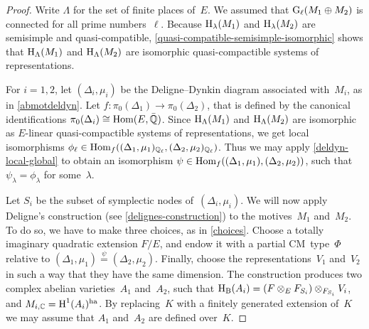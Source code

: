 \documentclass[10pt,twoside,leqno]{article}
\numberwithin{equation}{subsection}
\newcommand{\Hom}{\textnormal{Hom}}
\newcommand{\QQ}{\mathbb{Q}}
\newcommand{\QQbar}{\bar{\QQ}}
\newcommand{\QQl}{\QQ_{\ell}}
\newcommand{\CC}{\mathbb{C}}
\newcommand{\ha}{\textnormal{ha}}
\newcommand{\HH}{\textnormal{H}}
\newcommand{\Hlambda}{\HH_{\lambda}}
\newcommand{\HB}{\HH_{\textnormal{B}}}
\newcommand{\HLambda}{\HH_{\Lambda}}
\newcommand{\GG}{\textnormal{G}}
\newcommand{\Gl}{\GG_{\ell}}
\begin{document}
\begin{proposition}
\begin{proof}
  Write $\Lambda$ for the set of finite places of~$E$.
  We assumed that $\Gl(M_{1} \oplus M_{2})$
  is connected for all prime numbers~$\ell$.
  Because $\Hlambda(M_1)$ and $\Hlambda(M_2)$
  are semisimple and quasi-compatible,
  \cref{quasi-compatible-semisimple-isomorphic}
  shows that $\HLambda(M_1)$ and $\HLambda(M_2)$
  are isomorphic quasi-compactible systems of representations.

  For $i = 1,2$, let $(\Delta_i, \mu_i)$
  be the Deligne--Dynkin diagram associated with~$M_i$,
  as in \cref{abmotdeldyn}.
  Let $f \colon \pi_0(\Delta_1) \to \pi_0(\Delta_2)$,
  that is defined by the canonical identifications
  $\pi_0(\Delta_i) \cong \Hom(E,\QQbar)$.
  Since $\HLambda(M_1)$ and $\HLambda(M_2)$ are isomorphic
  as $E$-linear quasi-compactible systems of representations,
  we get local isomorphisms
  $\phi_\ell \in \Hom_f((\Delta_1,\mu_1)_{\QQl},(\Delta_2,\mu_2)_{\QQl})$.
  Thus we may apply \cref{deldyn-local-global}
  to obtain an isomorphism $\psi \in \Hom_f((\Delta_1,\mu_1),(\Delta_2,\mu_2))$,
  such that $\psi_\lambda = \phi_\lambda$ for some~$\lambda$.

  Let $S_i$ be the subset of symplectic nodes of~$(\Delta_i,\mu_i)$.
  We will now apply Deligne's construction (see \cref{delignes-construction})
  to the motives~$M_1$ and~$M_2$.
  To do so, we have to make three choices, as in \cref{choices}.
  Choose a totally imaginary quadratic extension $F/E$,
  and endow it with a partial CM~type~$\Phi$
  relative to $(\Delta_1,\mu_1) \stackrel{\psi}{=} (\Delta_2,\mu_2)$.
  Finally, choose the representations~$V_1$ and~$V_2$
  in such a way that they have the same dimension.
  The construction produces two complex abelian varieties~$A_1$ and~$A_2$,
  such that $\HB(A_i) = (F \otimes_E F_{S_i}) \otimes_{F_{S_i}} V_i$,
  and $M_{i,\CC} = \HH^1(A_i)^\ha$.
  By replacing~$K$ with a finitely generated extension of~$K$
  we may assume that $A_1$ and~$A_2$ are defined over~$K$.


\end{proof}
\end{proposition}
\end{document}
